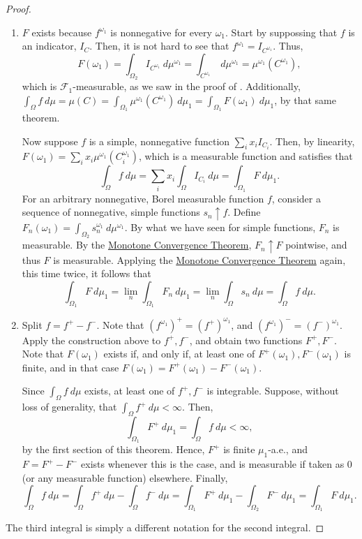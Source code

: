 \begin{proof}
    \begin{enumerate}
        \item \(F\) exists because \(f^{\omega_1}\) is nonnegative for every \(\omega_1\). Start by suppossing that \(f\) is an indicator, \(I_C\). Then, it is not hard to see that \(f^{\omega_1}=I_{C^{\omega_1}}\). Thus,
        \[
            F(\omega_1)=\int_{\Omega_2}I_{C^{\omega_1}}~d\mu^{\omega_1}=\int_{C^{\omega_1}}~d\mu^{\omega_1}=\mu^{\omega_1}(C^{\omega_1})
        ,\]
        which is \(\mathcal{F}_1\)-measurable, as we saw in the proof of . Additionally, \(\int_{\Omega}f~d\mu=\mu(C)=\int_{\Omega_1}\mu^{\omega_1}(C^{\omega_1})~d\mu_1=\int_{\Omega_1}F(\omega_1)~d\mu_1\), by that same theorem.

        Now suppose \(f\) is a simple, nonnegative function \(\sum_{i} x_iI_{C_i}\). Then, by linearity, \(F(\omega_1)=\sum_{i} x_i\mu^{\omega_1}(C_i^{\omega_1})\), which is a measurable function and satisfies that
        \[
            \int_{\Omega}f~d\mu=\sum_{i} x_i\int_{\Omega}I_{C_i}~d\mu=\int_{\Omega_1}F~d\mu_1
        .\]
				For an arbitrary nonnegative, Borel measurable function \(f\), consider a sequence of nonnegative, simple functions \(s_n\uparrow f\). Define \(F_n(\omega_1)=\int_{\Omega_2}s_n^{\omega_1}~d\mu^{\omega_1}\). By what we have seen for simple functions, \(F_n\) is measurable. By the \hyperref[theorem:monotone convergence]{Monotone Convergence Theorem}, \(F_n\uparrow F\) pointwise, and thus \(F\) is measurable.
        Applying the \hyperref[theorem:monotone convergence]{Monotone Convergence Theorem} again, this time twice, it follows that
        \[
            \int_{\Omega_1}F~d\mu_1=\lim_n\int_{\Omega_1}F_n~d\mu_1=\lim_n\int_{\Omega}s_n~d\mu=\int_{\Omega}f~d\mu
        .\]
    \item Split \(f=f^{+}-f^{-}\). Note that \((f^{\omega_1})^{+}=\left(f^{+}\right)^{\omega_1}\), and \((f^{\omega_1})^{-}=\left(f^{-}\right)^{\omega_1}\). Apply the construction above to \(f^{+},f^{-}\), and obtain two functions \(F^{+}, F^{-}\). Note that \(F(\omega_1)\) exists if, and only if, at least one of \(F^{+}(\omega_1),F^{-}(\omega_1)\) is finite, and in that case \(F(\omega_1)=F^{+}(\omega_1)-F^{-}(\omega_1)\).

    Since \(\int_{\Omega}f~d\mu\) exists, at least one of \(f^{+},f^{-}\) is integrable. Suppose, without loss of generality, that \(\int_{\Omega}f^{+}~d\mu<\infty\). Then,
    \[
        \int_{\Omega_1}F^{+}~d\mu_1=\int_{\Omega}f~d\mu<\infty
    ,\]
    by the first section of this theorem. Hence, \(F^{+}\) is finite \(\mu_1\)-a.e., and \(F=F^{+}-F^{-}\) exists whenever this is the case, and is measurable if taken as \(0\) (or any measurable function) elsewhere. Finally,
    \[
        \int_{\Omega}f~d\mu=\int_{\Omega}f^{+}~d\mu-\int_{\Omega}f^{-}~d\mu=\int_{\Omega_1}F^{+}~d\mu_1-\int_{\Omega_2}F^{-}~d\mu_1=\int_{\Omega_1}F~d\mu_1
    .\]
    \end{enumerate}
The third integral is simply a different notation for the second integral.
\end{proof}
